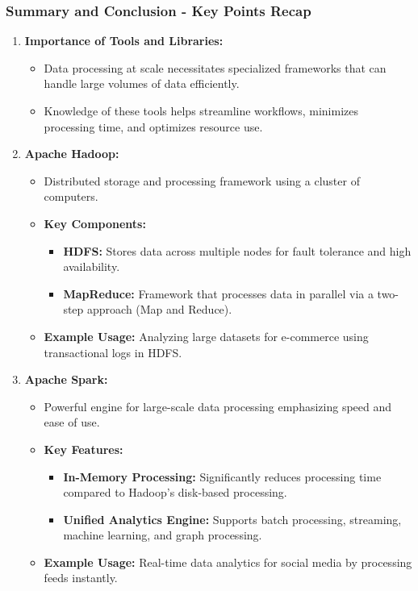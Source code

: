 \documentclass[aspectratio=169]{beamer}
\begin{document}
\begin{frame}[fragile]
    \frametitle{Summary and Conclusion - Key Points Recap}
    \begin{enumerate}
        \item \textbf{Importance of Tools and Libraries:}
            \begin{itemize}
                \item Data processing at scale necessitates specialized frameworks that can handle large volumes of data efficiently.
                \item Knowledge of these tools helps streamline workflows, minimizes processing time, and optimizes resource use.
            \end{itemize}
        
        \item \textbf{Apache Hadoop:}
            \begin{itemize}
                \item Distributed storage and processing framework using a cluster of computers.
                \item \textbf{Key Components:}
                    \begin{itemize}
                        \item \textbf{HDFS:} Stores data across multiple nodes for fault tolerance and high availability.
                        \item \textbf{MapReduce:} Framework that processes data in parallel via a two-step approach (Map and Reduce).
                    \end{itemize}
                \item \textbf{Example Usage:} Analyzing large datasets for e-commerce using transactional logs in HDFS.
            \end{itemize}
        
        \item \textbf{Apache Spark:}
            \begin{itemize}
                \item Powerful engine for large-scale data processing emphasizing speed and ease of use.
                \item \textbf{Key Features:}
                    \begin{itemize}
                        \item \textbf{In-Memory Processing:} Significantly reduces processing time compared to Hadoop's disk-based processing.
                        \item \textbf{Unified Analytics Engine:} Supports batch processing, streaming, machine learning, and graph processing.
                    \end{itemize}
                \item \textbf{Example Usage:} Real-time data analytics for social media by processing feeds instantly.
            \end{itemize}
    \end{enumerate}
\end{frame}
\end{document}

